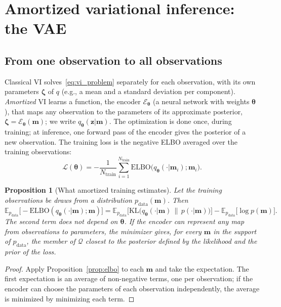 \documentclass[11pt,a4paper]{article}
\numberwithin{equation}{section}
\theoremstyle{plain}
\newtheorem{proposition}{Proposition}[section]
\theoremstyle{definition}
\theoremstyle{remark}
\newcommand{\m}{\mathbf{m}}
\newcommand{\z}{\mathbf{z}}
\newcommand{\thetab}{\bm{\theta}}
\newcommand{\zetab}{\bm{\zeta}}
\newcommand{\E}{\mathbb{E}}
\newcommand{\KL}{\mathrm{KL}}
\newcommand{\ELBO}{\mathrm{ELBO}}
\newcommand{\Lc}{\mathcal{L}}
\newcommand{\Ntr}{N_{\text{train}}}
\newcommand{\qth}{q_{\bm{\theta}}}
\begin{document}
\section{Amortized variational inference: the VAE}
\label{sec:amortized}

\subsection{From one observation to all observations}
Classical VI solves~\eqref{eq:vi_problem} separately for each observation, with its own parameters $\zetab$ of $q$ (e.g., a mean and a standard deviation per component). \emph{Amortized} VI \cite{kingma2014vae,rezende2014,zhang2019advances} learns a function, the encoder $\mathcal E_{\thetab}$ (a neural network with weights $\thetab$), that maps any observation to the parameters of its approximate posterior, $\zetab=\mathcal E_{\thetab}(\m)$; we write $\qth(\z|\m)$. The optimization is done once, during training; at inference, one forward pass of the encoder gives the posterior of a new observation.
The training loss is the negative ELBO averaged over the training observations:
\begin{equation}
\Lc(\thetab)=-\frac{1}{\Ntr}\sum_{i=1}^{\Ntr}\ELBO\big(\qth(\cdot|\m_i);\m_i\big).
\label{eq:amortized_loss}
\end{equation}

\begin{proposition}[What amortized training estimates]
\label{prop:amortized}
Let the training observations be draws from a distribution $p_{\text{data}}(\m)$. Then
\begin{equation}
\E_{p_{\text{data}}}\big[-\ELBO(\qth(\cdot|\m);\m)\big]=\E_{p_{\text{data}}}\Big[\KL\big(\qth(\cdot|\m)\,\|\,p(\cdot|\m)\big)\Big]-\E_{p_{\text{data}}}\big[\log p(\m)\big].
\end{equation}
The second term does not depend on $\thetab$. If the encoder can represent any map from observations to parameters, the minimizer gives, for every $\m$ in the support of $p_{\text{data}}$, the member of $\mathcal Q$ closest to the posterior defined by the likelihood and the prior of the loss.
\end{proposition}
\begin{proof}
Apply Proposition~\ref{prop:elbo} to each $\m$ and take the expectation. The first expectation is an average of non-negative terms, one per observation; if the encoder can choose the parameters of each observation independently, the average is minimized by minimizing each term.
\end{proof}
\end{document}
